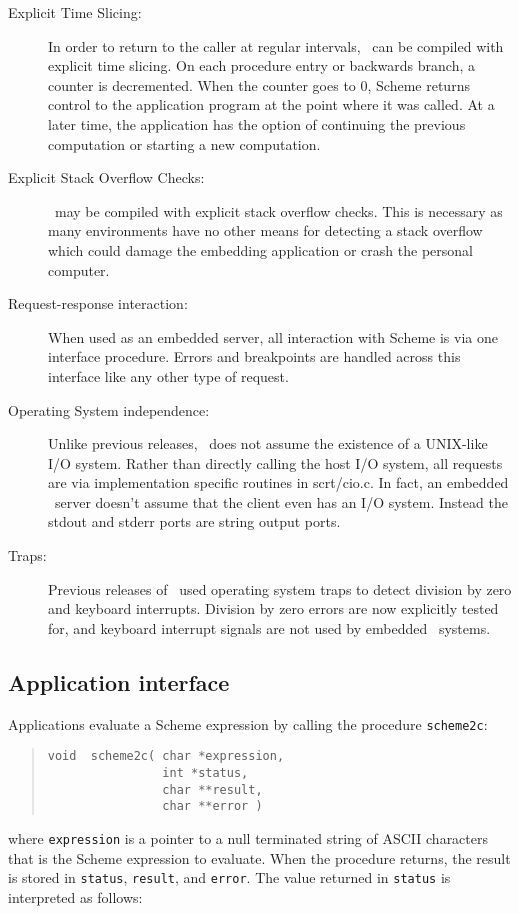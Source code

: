 \documentclass[12pt]{article}
\begin{document}
\begin{description}
\item[Explicit Time Slicing:] In order to return to the caller at
  regular intervals, \StoC\ can be compiled with explicit time
  slicing.  On each procedure entry or backwards branch, a counter is
  decremented. When the counter goes to 0, Scheme returns control to
  the application program at the point where it was called.  At a
  later time, the application has the option of continuing the
  previous computation or starting a new computation.

\item[Explicit Stack Overflow Checks:] \StoC\ may be compiled with
  explicit stack overflow checks.  This is necessary as many
  environments have no other means for detecting a stack overflow
  which could damage the embedding application or crash the personal
  computer.

\item[Request-response interaction:] When used as an embedded server,
  all interaction with Scheme is via one interface procedure.  Errors
  and breakpoints are handled across this interface like any other
  type of request.

\item[Operating System independence:] Unlike previous releases,
  \StoC\ does not assume the existence of a UNIX-like I/O system.
  Rather than directly calling the host I/O system, all requests are
  via implementation specific routines in scrt/cio.c.  In fact, an
  embedded \StoC\ server doesn't assume that the client even has an
  I/O system.  Instead the stdout and stderr ports are string output
  ports.

\item[Traps:] Previous releases of \StoC\ used operating system traps
  to detect division by zero and keyboard interrupts.  Division by
  zero errors are now explicitly tested for, and keyboard interrupt
  signals are not used by embedded \StoC\ systems.
\end{description}

\subsection*{Application interface}

Applications evaluate a Scheme expression by calling the procedure
\texttt{scheme2c}:
\begin{quote}
\begin{verbatim}
void  scheme2c( char *expression,
                int *status,
                char **result,
                char **error )
\end{verbatim}
\end{quote}
where \texttt{expression} is a pointer to a null terminated string of
ASCII characters that is the Scheme expression to evaluate.  When the
procedure returns, the result is stored in \texttt{status},
\texttt{result}, and \texttt{error}.  The value returned in
\texttt{status} is interpreted as follows:
\end{document}
